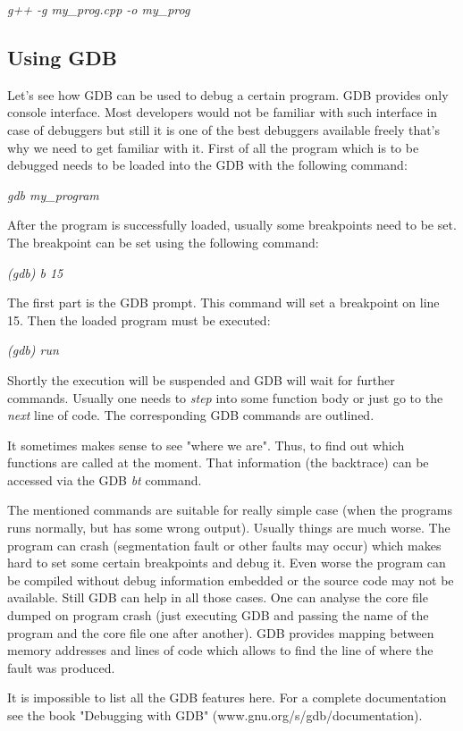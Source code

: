 \textit { g++ -g my\_prog.cpp -o my\_prog}

\subsection{Using GDB}
Let's see how GDB can be used to debug a certain program. GDB provides only console interface. Most developers would not be familiar with such interface in case of debuggers but still it is one of the best debuggers available freely that's why we need to get familiar with it. First of all the program which is to be debugged needs to be loaded into the GDB with the following command:

\textit { gdb my\_program }

After the program is successfully loaded, usually some breakpoints need to be set. The breakpoint can be set using the following command:

\textit { (gdb) b 15 }

The first part is the GDB prompt. This command will set a breakpoint on line 15. Then the loaded program must be executed:

\textit { (gdb) run }

Shortly the execution will be suspended and GDB will wait for further commands. Usually one needs to \textit { step} into some function body or just go to the \textit { next} line of code. The corresponding GDB commands are outlined.

It sometimes makes sense to see "where we are". Thus, to find out which functions are called at the moment. That information (the backtrace) can be accessed via the GDB \textit { bt} command.

The mentioned commands are suitable for really simple case (when the programs runs normally, but has some wrong output). Usually things are much worse. The program can crash (segmentation fault or other faults may occur) which makes hard to set some certain breakpoints and debug it. Even worse the program can be compiled without debug information embedded or the source code may not be available. Still GDB can help in all those cases. One can analyse the core file dumped on program crash (just executing GDB and passing the name of the program and the core file one after another). GDB provides mapping between memory addresses and lines of code which allows to find the line of where the fault was produced. 

It is impossible to list all the GDB features here. For a complete documentation see the book "Debugging with GDB" (www.gnu.org/s/gdb/documentation).

